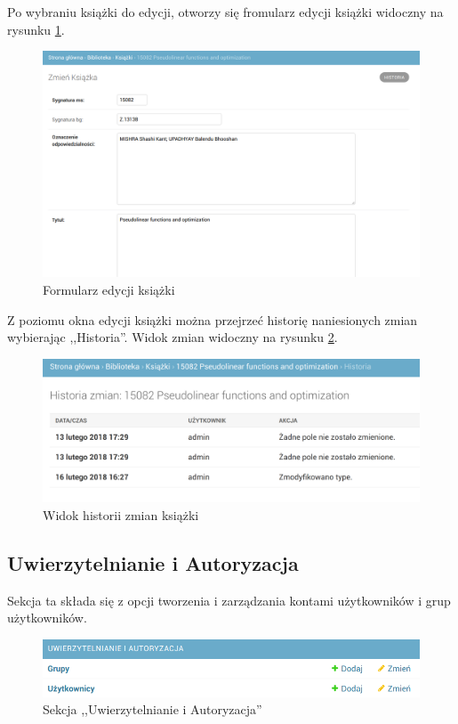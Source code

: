 \documentclass[twoside]{projektInzynierskiMS}
\begin{document}
Po wybraniu książki do edycji, otworzy się fromularz edycji książki widoczny na rysunku \ref{fig:adminEditBook}.

\begin{figure}[h]
  \centering
  \includegraphics[width=0.6\linewidth]{img/backend/EdycjaKsiazki.png}
  \caption{Formularz edycji książki}
  \label{fig:adminEditBook}
\end{figure}

Z poziomu okna edycji książki można przejrzeć historię naniesionych zmian wybierając ,,Historia''. Widok zmian widoczny na rysunku \ref{fig:adminBookHistory}.

\begin{figure}[h]
  \centering
  \includegraphics[width=0.6\linewidth]{img/backend/HistoriaZmian.png}
  \caption{Widok historii zmian książki}
  \label{fig:adminBookHistory}
\end{figure}


\subsection{Uwierzytelnianie i Autoryzacja}
Sekcja ta składa się z opcji tworzenia i zarządzania kontami użytkowników i grup użytkowników.

\begin{figure}[h]
  \centering
  \includegraphics[width=0.6\linewidth]{img/backend/autoryzacja.png}
  \caption{Sekcja ,,Uwierzytelnianie i Autoryzacja''}
  \label{fig:authSection}
\end{figure}
\end{document}
